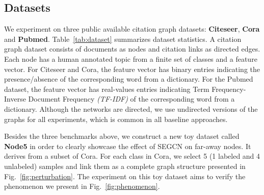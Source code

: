 \documentclass[letterpaper]{article} \usepackage{aaai19}  \usepackage{times}  \usepackage{helvet}  \usepackage{courier}  \usepackage{url}  \usepackage{graphicx}  \usepackage{algorithm}
\begin{document}
\subsection{Datasets}
We experiment on three public available citation graph datasets: \textbf{Citeseer}, \textbf{Cora} and \textbf{Pubmed}. Table~\ref{tab:dataset} summarizes dataset statistics. A citation graph dataset consists of documents as nodes and citation links as directed edges. Each node has a human annotated topic from a finite set of classes and a feature vector. For Citeseer and Cora, the feature vector has binary entries indicating the presence/absence of the corresponding word from a dictionary. For the Pubmed dataset, the feature vector has real-values entries indicating Term Frequency-Inverse Document Frequency \emph{(TF-IDF)} of the corresponding word from a dictionary. Although the networks are directed, we use undirected versions of the graphs for all experiments, which is common in all baseline approaches.

Besides the three benchmarks above, we construct a new toy dataset called \textbf{Node5} in order to clearly showcase the effect of SEGCN on far-away nodes. It derives from a subset of Cora. For each class in Cora, we select 5 (1 labeled and 4 unlabeled) samples and link them as a complete graph structure presented in Fig.~\ref{fig:perturbation}. The experiment on this toy dataset aims to verify the phenomenon we present in Fig.~\ref{fig:phenomenon}.
\begin{table}[t]
\caption{Dataset statistics}
\label{tab:dataset}
\vspace{0.1cm}
\centering
{}
\end{table} 
\end{document}
